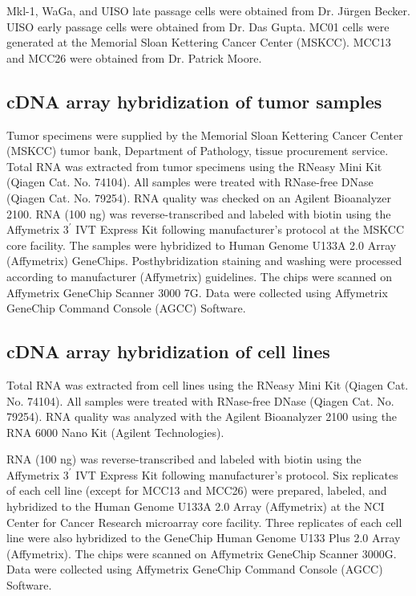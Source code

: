 \documentclass[10pt]{article}
\begin{document}
Mkl-1, WaGa, and UISO late passage cells were obtained from Dr. J\"{u}rgen Becker.
UISO early passage cells were obtained from Dr. Das Gupta.
MC01 cells were generated at the Memorial Sloan Kettering Cancer Center (MSKCC).
MCC13 and MCC26 were obtained from Dr. Patrick Moore.

\subsection*{cDNA array hybridization of tumor samples}
Tumor specimens were supplied by the Memorial Sloan Kettering Cancer Center (MSKCC) tumor bank, Department of Pathology, tissue procurement service.
Total RNA was extracted from tumor specimens using the RNeasy Mini Kit (Qiagen Cat. No. 74104).
All samples were treated with RNase-free DNase (Qiagen Cat. No. 79254).
RNA quality was checked on an Agilent Bioanalyzer 2100.
RNA (100 ng) was reverse-transcribed and labeled with biotin using the Affymetrix $3^{\prime}$ IVT Express Kit following manufacturer's protocol at the MSKCC core facility.
The samples were hybridized to Human Genome U133A 2.0 Array (Affymetrix) GeneChips.
Posthybridization staining and washing were processed according to manufacturer (Affymetrix) guidelines.
The chips were scanned on Affymetrix GeneChip Scanner 3000 7G.
Data were collected using Affymetrix GeneChip Command Console (AGCC) Software.


\subsection*{cDNA array hybridization of cell lines}

Total RNA was extracted from cell lines using the RNeasy Mini Kit (Qiagen Cat. No. 74104).
All samples were treated with RNase-free DNase (Qiagen Cat. No. 79254).
RNA quality was analyzed with the Agilent Bioanalyzer 2100 using the RNA 6000 Nano Kit (Agilent Technologies).

RNA (100 ng) was reverse-transcribed and labeled with biotin using the Affymetrix $3^{\prime}$ IVT Express Kit following manufacturer's protocol.
Six replicates of each cell line (except for MCC13 and MCC26) were prepared, labeled, and hybridized to the Human Genome U133A 2.0 Array (Affymetrix) at the NCI Center for Cancer Research microarray core facility.
Three replicates of each cell line were also hybridized to the GeneChip Human Genome U133 Plus 2.0 Array (Affymetrix).
The chips were scanned on Affymetrix GeneChip Scanner 3000G.
Data were collected using Affymetrix GeneChip Command Console (AGCC) Software.
\end{document}

